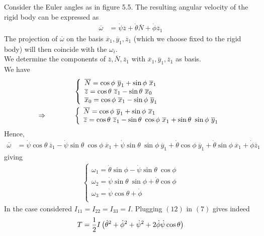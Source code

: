 Consider the Euler angles as in figure 5.5. The resulting angular velocity of the rigid body can be expressed as 
\begin{align}
\overline{\omega}&= \dot{\psi}\overline{z}+\dot{\theta}\overline{N}+\dot{\phi}\overline{z}_1
\end{align}
The projection of $\overline{\omega}$ on the basis $\overline{x}_1,\overline{y}_1,\overline{z}_1$ (which we choose fixed to the rigid body) will then coincide with the $\omega_i$.\\
We determine the components of $\overline{z},\overline{N},\overline{z}_1$ with $\overline{x}_1,\overline{y}_1,\overline{z}_1$ as basis.\\
We have
\begin{align}
& \left\{\begin{array}{l}
\overline{N}=\cos{\phi} \ \overline{y}_1+\sin{\phi} \ \overline{x}_1\\
\overline{z}= \cos{\theta} \ \overline{z}_1-\sin{\theta}\ \overline{x}_0\\
\overline{x}_0=\cos{\phi} \ \overline{x}_1-\sin{\phi} \ \overline{y}_1
\end{array}\right.\\
\Rightarrow \spatie &\left\{\begin{array}{l}
\overline{N}=\cos{\phi} \ \overline{y}_1+\sin{\phi} \ \overline{x}_1\\
\overline{z}= \cos{\theta} \ \overline{z}_1-\sin{\theta}\ \cos{\phi} \ \overline{x}_1 +\sin{\theta}\ \sin{\phi} \ \overline{y}_1
\end{array}\right.
\end{align}
Hence,
\begin{align}
 \overline{\omega}&= \dot{\psi}\cos{\theta} \ \overline{z}_1-\dot{\psi}\sin{\theta}\ \cos{\phi} \ \overline{x}_1 +\dot{\psi}\sin{\theta}\ \sin{\phi} \ \overline{y}_1+\dot{\theta}\cos{\phi} \ \overline{y}_1+\dot{\theta}\sin{\phi} \ \overline{x}_1+\dot{\phi}\overline{z}_1
\end{align}
giving
\begin{align}
\left\{\begin{array}{l}
\omega_1= \dot{\theta}\sin{\phi} -\dot{\psi}\sin{\theta}\ \cos{\phi}\\
\omega_2= \dot{\psi}\sin{\theta}\ \sin{\phi}+\dot{\theta}\cos{\phi}\\
\omega_3= \dot{\psi}\cos{\theta} +\dot{\phi}\\
\end{array}\right.
\end{align}
In the case  considered $I_{11}=I_{22}=I_{33}=I$. Plugging $(12)$ in $(7)$ gives indeed
$$T=\frac{1}{2} I\left(\dot{\theta}^2+\dot{\phi}^2+\dot{\psi}^2+2\dot{\phi}\dot{\psi}\cos{\theta} \right)$$


